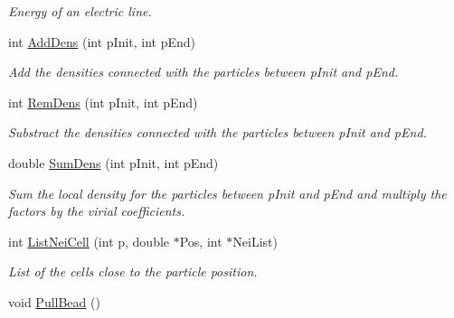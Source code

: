 \begin{DoxyCompactItemize}
\begin{DoxyCompactList}\small\item\em Energy of an electric line. \end{DoxyCompactList}\item 
int \hyperlink{classForces_a9d4e2ba1cf8ce2142f50a1b7e8bf4f7b}{Add\+Dens} (int p\+Init, int p\+End)\hypertarget{classForces_a9d4e2ba1cf8ce2142f50a1b7e8bf4f7b}{}\label{classForces_a9d4e2ba1cf8ce2142f50a1b7e8bf4f7b}

\begin{DoxyCompactList}\small\item\em Add the densities connected with the particles between p\+Init and p\+End. \end{DoxyCompactList}\item 
int \hyperlink{classForces_ab1186dfbad2e6906d0da986495e05872}{Rem\+Dens} (int p\+Init, int p\+End)\hypertarget{classForces_ab1186dfbad2e6906d0da986495e05872}{}\label{classForces_ab1186dfbad2e6906d0da986495e05872}

\begin{DoxyCompactList}\small\item\em Substract the densities connected with the particles between p\+Init and p\+End. \end{DoxyCompactList}\item 
double \hyperlink{classForces_a0449e9410bf23ad4d073f1eab66c2a68}{Sum\+Dens} (int p\+Init, int p\+End)\hypertarget{classForces_a0449e9410bf23ad4d073f1eab66c2a68}{}\label{classForces_a0449e9410bf23ad4d073f1eab66c2a68}

\begin{DoxyCompactList}\small\item\em Sum the local density for the particles between p\+Init and p\+End and multiply the factors by the virial coefficients. \end{DoxyCompactList}\item 
int \hyperlink{classForces_a74fa0e6d8f6f25674644320d69e2b8b1}{List\+Nei\+Cell} (int p, double $\ast$Pos, int $\ast$Nei\+List)\hypertarget{classForces_a74fa0e6d8f6f25674644320d69e2b8b1}{}\label{classForces_a74fa0e6d8f6f25674644320d69e2b8b1}

\begin{DoxyCompactList}\small\item\em List of the cells close to the particle position. \end{DoxyCompactList}\item 
void \hyperlink{classForces_a6fc6ac99c5e421a12a39ad80e20c9bd6}{Pull\+Bead} ()\hypertarget{classForces_a6fc6ac99c5e421a12a39ad80e20c9bd6}{}\label{classForces_a6fc6ac99c5e421a12a39ad80e20c9bd6}


\end{DoxyCompactItemize}
